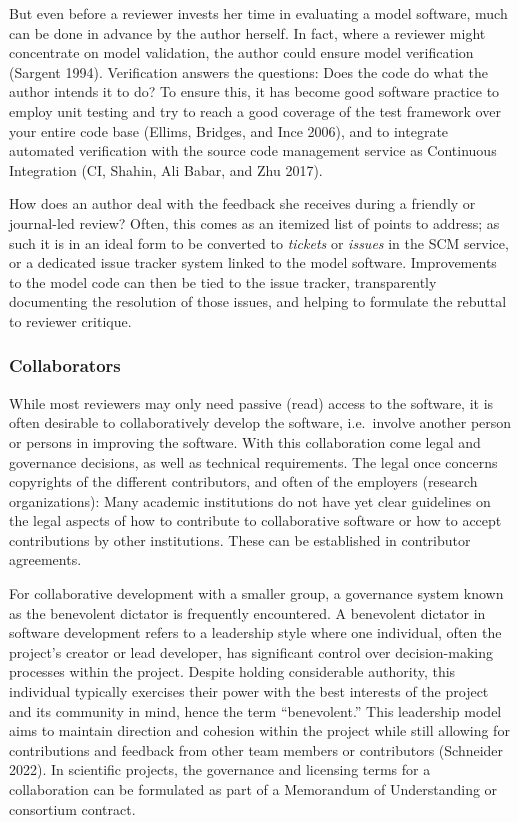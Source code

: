 \documentclass[preprint,11pt,5p]{elsarticle}
\begin{document}
But even before a reviewer invests her time in evaluating a model
software, much can be done in advance by the author herself. In fact,
where a reviewer might concentrate on model validation, the author could
ensure model verification (Sargent 1994). Verification answers the
questions: Does the code do what the author intends it to do? To ensure
this, it has become good software practice to employ unit testing and
try to reach a good coverage of the test framework over your entire code
base (Ellims, Bridges, and Ince 2006), and to integrate automated
verification with the source code management service as Continuous
Integration (CI, Shahin, Ali Babar, and Zhu 2017).

How does an author deal with the feedback she receives during a friendly
or journal-led review? Often, this comes as an itemized list of points
to address; as such it is in an ideal form to be converted to
\emph{tickets} or \emph{issues} in the SCM service, or a dedicated issue
tracker system linked to the model software. Improvements to the model
code can then be tied to the issue tracker, transparently documenting
the resolution of those issues, and helping to formulate the rebuttal to
reviewer critique.

\subsubsection{Collaborators}\label{collaborators}

While most reviewers may only need passive (read) access to the
software, it is often desirable to collaboratively develop the software,
i.e.~involve another person or persons in improving the software. With
this collaboration come legal and governance decisions, as well as
technical requirements. The legal once concerns copyrights of the
different contributors, and often of the employers (research
organizations): Many academic institutions do not have yet clear
guidelines on the legal aspects of how to contribute to collaborative
software or how to accept contributions by other institutions. These can
be established in contributor agreements.

For collaborative development with a smaller group, a governance system
known as the benevolent dictator is frequently encountered. A benevolent
dictator in software development refers to a leadership style where one
individual, often the project's creator or lead developer, has
significant control over decision-making processes within the project.
Despite holding considerable authority, this individual typically
exercises their power with the best interests of the project and its
community in mind, hence the term ``benevolent.'' This leadership model
aims to maintain direction and cohesion within the project while still
allowing for contributions and feedback from other team members or
contributors (Schneider 2022). In scientific projects, the governance
and licensing terms for a collaboration can be formulated as part of a
Memorandum of Understanding or consortium contract.
\end{document}
